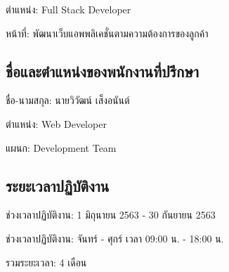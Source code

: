 ตำแหน่ง: Full Stack Developer

หน้าที่: พัฒนาเว็บแอพพลิเคชั่นตามความต้องการของลูกค้า

\subsection{ชื่อและตำแหน่งของพนักงานที่ปรึกษา}

ชื่อ-นามสกุล: นายวิวัฒน์ เส็งอนันต์

ตำแหน่ง: Web Developer

แผนก: Development Team

\subsection{ระยะเวลาปฏิบัติงาน}

ช่วงเวลาปฏิบัติงาน: 1 มิถุนายน 2563 - 30 กันยายน 2563

ช่วงเวลาปฏิบัติงาน: จันทร์ - ศุกร์ เวลา 09:00 น. - 18:00 น.

รวมระยะเวลา: 4 เดือน


